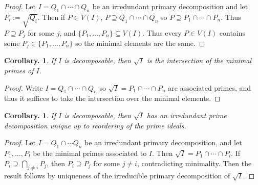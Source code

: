 \documentclass[11pt, a4paper]{memoir}
\theoremstyle{change}
\newtheorem{corollary}[theorem]{Corollary.}
\theoremstyle{plain}
\theoremstyle{nonumberplain}
\newtheorem{proof}{Proof}
\numberwithin{equation}{section}
\begin{document}
\begin{proof}
    Let $I=Q_1\cap\cdots\cap Q_n$ be an irredundant primary decomposition and let $P_i:=\sqrt{Q_i}$.
    Then if $P\in V(I)$, $P\supseteq Q_1\cap\cdots\cap Q_n$ so $P\supseteq P_1\cap\cdots\cap P_n$.
    Thus $P\supseteq P_j$ for some $j$, and $\{P_1,\ldots,P_n\}\subseteq V(I)$.
    Thus every $P\in V(I)$ contains some $P_j\in\{P_1,\ldots,P_n\}$ so the minimal elements are the same.
\end{proof}
\begin{corollary}
    If $I$ is decomposable, then $\sqrt{I}$ is the intersection of the minimal primes of $I$.
\end{corollary}
\begin{proof}
    Write $I=Q_1\cap\cdots\cap Q_n$ so $\sqrt{I}=P_1\cap\cdots\cap P_n$ are associated primes, and thus it suffices to take the intersection over the minimal elements.
\end{proof}
\begin{corollary}
    If $I$ is decomposable, then $\sqrt{I}$ has an irredundant prime decomposition unique up to reordering of the prime ideals.
\end{corollary}
\begin{proof}
    Let $I=Q_1\cap\cdots Q_n$ be an irredundant primary decomposition, and let $P_1,\ldots,P_l$ be the minimal primes associated to $I$.
    Then $\sqrt{I}=P_1\cap\cdots\cap P_l$.
    If $P_i\supseteq\bigcap_{j\neq i}P_j$, then $P_i\supseteq P_j$ for some $j\neq i$, contradicting minimality.
    Then the result follows by uniqueness of the irreducible primary decomposition of $\sqrt{I}$.
\end{proof}
\end{document}
